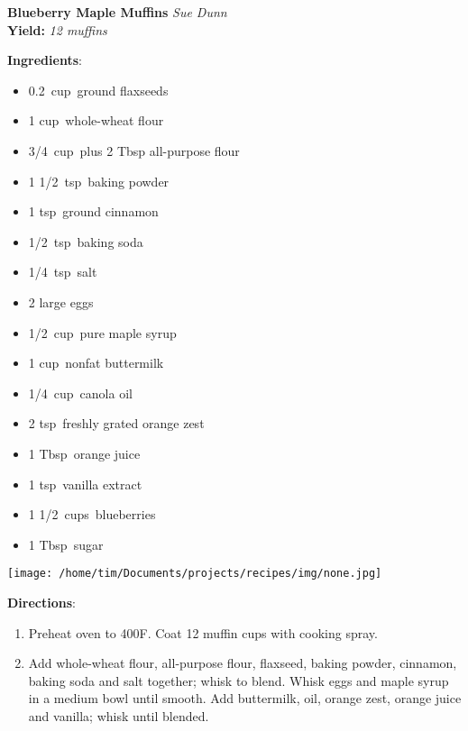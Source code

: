 \documentclass[11pt, twoside, openany]{book}
\begin{document}
\noindent\begin{minipage}[t]{\linewidth}%
{\Large\textbf{Blueberry Maple Muffins}} \label{blueberry-maple-muffins}\hfill\textit{Sue Dunn}\\
\textbf{Yield:} \textit{12 muffins}\\
\noindent\begin{minipage}[t]{0.78\linewidth}%
\textbf{Ingredients}:\vspace{-3mm}
\begin{multicols}{2}
\begin{itemize}\setlength\itemsep{-1mm}
\item 0.2 cup ground flaxseeds
\item 1 cup whole-wheat flour
\item 3/4 cup plus 2 Tbsp all-purpose flour
\item 1 1/2 tsp baking powder
\item 1 tsp ground cinnamon
\item 1/2 tsp baking soda
\item 1/4 tsp salt
\item 2 large eggs
\item 1/2 cup pure maple syrup
\item 1 cup nonfat buttermilk
\item 1/4 cup canola oil
\item 2 tsp freshly grated orange zest
\item 1 Tbsp orange juice
\item 1 tsp vanilla extract
\item 1 1/2 cups blueberries
\item 1 Tbsp sugar
\end{itemize}
\end{multicols}
\end{minipage}
\noindent\begin{minipage}[t]{0.18\linewidth}
\centering \strut\vspace*{-\baselineskip}\newline
\texttt{[image: /home/tim/Documents/projects/recipes/img/none.jpg]}\\
\end{minipage}\vspace{3mm}
\textbf{Directions}:
\vspace{-3mm}\begin{enumerate}\setlength\itemsep{-1mm}
\item Preheat oven to 400F. Coat 12 muffin cups with cooking spray.
\item Add whole-wheat flour, all-purpose flour, flaxseed, baking powder, cinnamon, baking soda and salt together; whisk to blend. Whisk eggs and maple syrup in a medium bowl until smooth. Add buttermilk, oil, orange zest, orange juice and vanilla; whisk until blended.

\end{enumerate}
\end{minipage}
\end{document}
